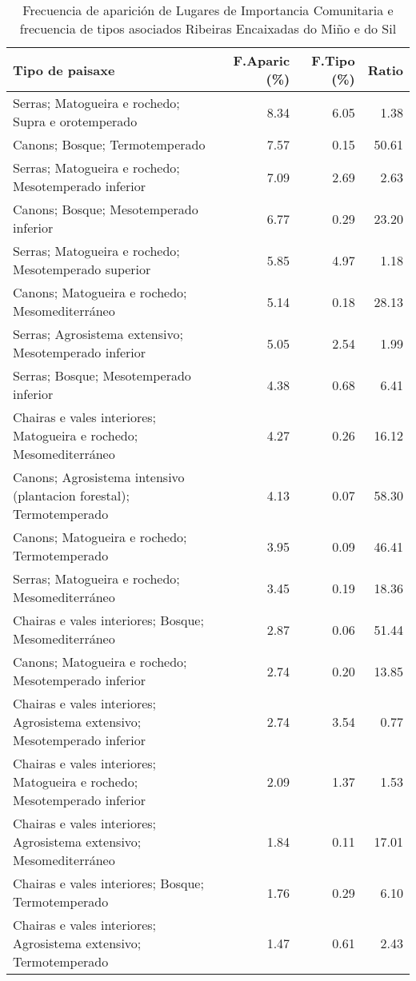 \begin{table}[p]
\centering
\caption{Frecuencia de aparición de Lugares de Importancia Comunitaria e frecuencia de tipos asociados Ribeiras Encaixadas do Miño e do Sil} 
\label{vnatura4}
\begin{tabular}{lrrr}
  \hline
Tipo de paisaxe & F.Aparic (\%) & F.Tipo (\%) & Ratio \\ 
  \hline
Serras; Matogueira e rochedo; Supra e orotemperado & 8.34 & 6.05 & 1.38 \\ 
  Canons; Bosque; Termotemperado & 7.57 & 0.15 & 50.61 \\ 
  Serras; Matogueira e rochedo; Mesotemperado inferior & 7.09 & 2.69 & 2.63 \\ 
  Canons; Bosque; Mesotemperado inferior & 6.77 & 0.29 & 23.20 \\ 
  Serras; Matogueira e rochedo; Mesotemperado superior & 5.85 & 4.97 & 1.18 \\ 
  Canons; Matogueira e rochedo; Mesomediterráneo & 5.14 & 0.18 & 28.13 \\ 
  Serras; Agrosistema extensivo; Mesotemperado inferior & 5.05 & 2.54 & 1.99 \\ 
  Serras; Bosque; Mesotemperado inferior & 4.38 & 0.68 & 6.41 \\ 
  Chairas e vales interiores; Matogueira e rochedo; Mesomediterráneo & 4.27 & 0.26 & 16.12 \\ 
  Canons; Agrosistema intensivo (plantacion forestal); Termotemperado & 4.13 & 0.07 & 58.30 \\ 
  Canons; Matogueira e rochedo; Termotemperado & 3.95 & 0.09 & 46.41 \\ 
  Serras; Matogueira e rochedo; Mesomediterráneo & 3.45 & 0.19 & 18.36 \\ 
  Chairas e vales interiores; Bosque; Mesomediterráneo & 2.87 & 0.06 & 51.44 \\ 
  Canons; Matogueira e rochedo; Mesotemperado inferior & 2.74 & 0.20 & 13.85 \\ 
  Chairas e vales interiores; Agrosistema extensivo; Mesotemperado inferior & 2.74 & 3.54 & 0.77 \\ 
  Chairas e vales interiores; Matogueira e rochedo; Mesotemperado inferior & 2.09 & 1.37 & 1.53 \\ 
  Chairas e vales interiores; Agrosistema extensivo; Mesomediterráneo & 1.84 & 0.11 & 17.01 \\ 
  Chairas e vales interiores; Bosque; Termotemperado & 1.76 & 0.29 & 6.10 \\ 
  Chairas e vales interiores; Agrosistema extensivo; Termotemperado & 1.47 & 0.61 & 2.43 \\ 

\end{tabular}
\end{table}
